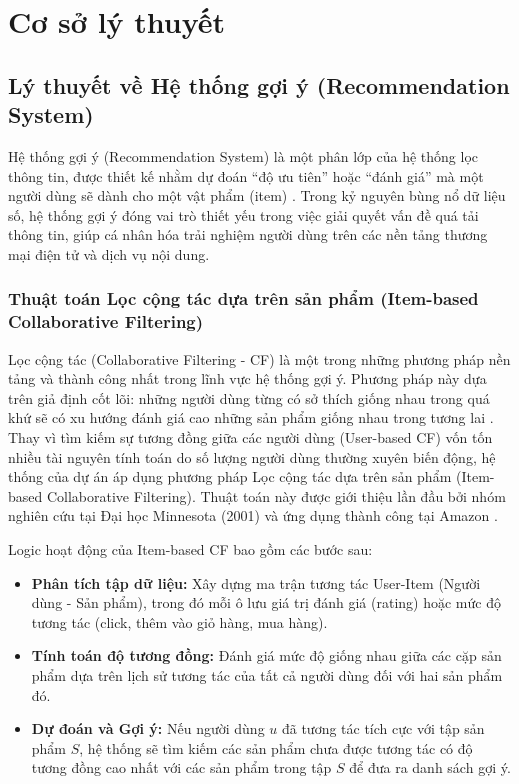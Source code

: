 \documentclass{report}
\begin{document}
\chapter{Cơ sở lý thuyết}
\label{chap:lythuyet}

\section{Lý thuyết về Hệ thống gợi ý (Recommendation System)}

Hệ thống gợi ý (Recommendation System) là một phân lớp của hệ thống lọc thông tin, được thiết kế nhằm dự đoán ``độ ưu tiên'' hoặc ``đánh giá'' mà một người dùng sẽ dành cho một vật phẩm (item) \cite{ekstrand2011collaborative}. Trong kỷ nguyên bùng nổ dữ liệu số, hệ thống gợi ý đóng vai trò thiết yếu trong việc giải quyết vấn đề quá tải thông tin, giúp cá nhân hóa trải nghiệm người dùng trên các nền tảng thương mại điện tử và dịch vụ nội dung.

\subsection{Thuật toán Lọc cộng tác dựa trên sản phẩm (Item-based Collaborative Filtering)}

Lọc cộng tác (Collaborative Filtering - CF) là một trong những phương pháp nền tảng và thành công nhất trong lĩnh vực hệ thống gợi ý. Phương pháp này dựa trên giả định cốt lõi: những người dùng từng có sở thích giống nhau trong quá khứ sẽ có xu hướng đánh giá cao những sản phẩm giống nhau trong tương lai \cite{ekstrand2011collaborative}. Thay vì tìm kiếm sự tương đồng giữa các người dùng (User-based CF) vốn tốn nhiều tài nguyên tính toán do số lượng người dùng thường xuyên biến động, hệ thống của dự án áp dụng phương pháp Lọc cộng tác dựa trên sản phẩm (Item-based Collaborative Filtering). Thuật toán này được giới thiệu lần đầu bởi nhóm nghiên cứu tại Đại học Minnesota (2001) và ứng dụng thành công tại Amazon \cite{linden2003amazon}.

Logic hoạt động của Item-based CF bao gồm các bước sau:
\begin{itemize}
    \item \textbf{Phân tích tập dữ liệu:} Xây dựng ma trận tương tác User-Item (Người dùng - Sản phẩm), trong đó mỗi ô lưu giá trị đánh giá (rating) hoặc mức độ tương tác (click, thêm vào giỏ hàng, mua hàng).
    \item \textbf{Tính toán độ tương đồng:} Đánh giá mức độ giống nhau giữa các cặp sản phẩm dựa trên lịch sử tương tác của tất cả người dùng đối với hai sản phẩm đó.
    \item \textbf{Dự đoán và Gợi ý:} Nếu người dùng $u$ đã tương tác tích cực với tập sản phẩm $S$, hệ thống sẽ tìm kiếm các sản phẩm chưa được tương tác có độ tương đồng cao nhất với các sản phẩm trong tập $S$ để đưa ra danh sách gợi ý.
\end{itemize}
\end{document}
